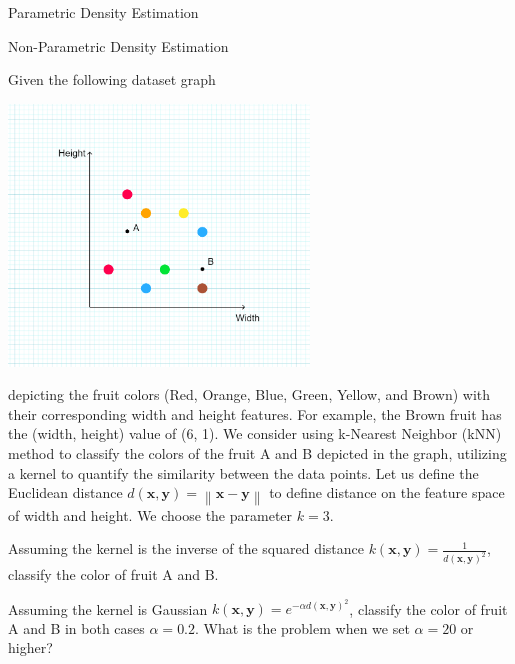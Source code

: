 \documentclass[
	ngerman,
	points=true,%
    solution=true,
    accentcolor=9c,
    colorbacktitle
	]{tudaexercise}
\begin{document}
\begin{task}{Parametric Density Estimation}
\begin{solution}
    \end{solution}
\end{task}

\begin{task}{Non-Parametric Density Estimation}

Given the following dataset graph

\begin{center}
    \includegraphics[width=0.6\textwidth]{figures/non_parametric_ex.png}
    \label{fig:fruit}
\end{center}

depicting the fruit colors (Red, Orange, Blue, Green, Yellow, and Brown) with their corresponding width and height features. For example, the Brown fruit has the (width, height) value of (6, 1). We consider using k-Nearest Neighbor (kNN) method to classify the colors of the fruit A and B depicted in the graph, utilizing a kernel to quantify the similarity between the data points. Let us define the Euclidean distance $d(\boldsymbol{x}, \boldsymbol{y}) = \left\| \boldsymbol{x} - \boldsymbol{y}\right\|$ to define distance on the feature space of width and height. We choose the parameter $k = 3$.

\begin{subtask}

Assuming the kernel is the inverse of the squared distance  $k(\boldsymbol{x}, \boldsymbol{y}) = \frac{1}{d(\boldsymbol{x}, \boldsymbol{y})^2}$, classify the color of fruit A and B.
    
\end{subtask}

\begin{subtask}

Assuming the kernel is Gaussian $k(\boldsymbol{x}, \boldsymbol{y}) = e^{-\alpha d(\boldsymbol{x}, \boldsymbol{y})^2}$, classify the color of fruit A and B in both cases $\alpha=0.2$. What is the problem when we set $\alpha = 20$ or higher?
    
\end{subtask}
    
\end{task}
\end{document}
